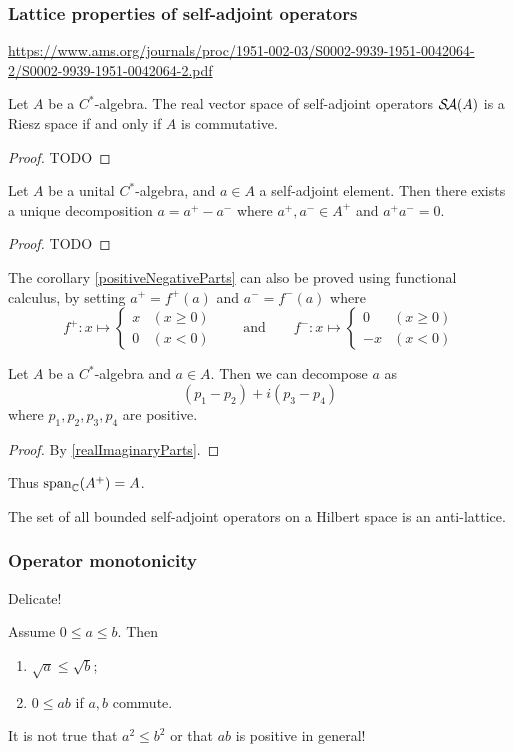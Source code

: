 \subsubsection{Lattice properties of self-adjoint operators}
\url{https://www.ams.org/journals/proc/1951-002-03/S0002-9939-1951-0042064-2/S0002-9939-1951-0042064-2.pdf}

\begin{proposition}
Let $A$ be a $C^*$-algebra. The real vector space of self-adjoint operators $\mathop{\mathcal{S}\hspace{-0.15em}\mathcal{A}}\nolimits(A)$ is a Riesz space \textup{if and only if} $A$ is commutative.
\end{proposition}
\begin{proof}
TODO
\end{proof}
\begin{corollary} \label{positiveNegativeParts}
Let $A$ be a unital $C^*$-algebra, and $a\in A$ a self-adjoint element. Then there exists a unique decomposition $a=a^+ - a^-$ where $a^+,a^-\in A^+$ and $a^+a^- = 0$.
\end{corollary}
\begin{proof}
TODO
\end{proof}
The corollary \ref{positiveNegativeParts} can also be proved using functional calculus, by setting $a^+ = f^+(a)$ and $a^- = f^-(a)$ where
\[ f^+: x\mapsto \begin{cases}
x & (x\geq 0)\\ 0 & (x < 0)
\end{cases} \qquad\text{and}\qquad f^-: x\mapsto \begin{cases}
0 & (x\geq 0)\\ -x & (x < 0)
\end{cases} \]

\begin{corollary} \label{CartesianDecomposition}
Let $A$ be a $C^*$-algebra and $a\in A$. Then we can decompose $a$ as
\[ (p_1-p_2) + i(p_3-p_4) \]
where $p_1,p_2,p_3,p_4$ are positive.
\end{corollary}
\begin{proof}
By \ref{realImaginaryParts}.
\end{proof}
Thus $\operatorname{span}_{\mathbb{C}}(A^+) = A$.

\begin{proposition}
The set of all bounded self-adjoint operators on a Hilbert space is an anti-lattice.
\end{proposition}

\subsubsection{Operator monotonicity}
Delicate!
\begin{proposition}
Assume $0\leq a\leq b$. Then
\begin{enumerate}
\item $\sqrt{a}\leq \sqrt{b}$;
\item $0\leq ab$ if $a,b$ commute.
\end{enumerate}
\end{proposition}
It is not true that $a^2\leq b^2$ or that $ab$ is positive in general!


